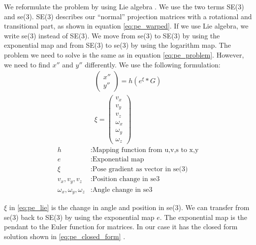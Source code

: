 \documentclass[11pt,a4paper,titlepage,oneside]{report}
\begin{document}
We reformulate the problem by using Lie algebra \cite{se3_explain}. We use the two terms SE(3) and se(3). SE(3) describes our ``normal'' projection matrices with a rotational and transitional part, as shown in equation \ref{eq:pe_warped}. If we use Lie algebra, we write se(3) instead of SE(3). We move from se(3) to SE(3) by using the exponential map and from SE(3) to se(3) by using the logarithm map. The problem we need to solve is the same as in equation \ref{eq:pe_problem}. However, we need to find $x''$ and $y''$ differently. We use the following formulation:
\begin{equation}\label{eq:pe_lie}
  \begin{gathered}
    \begin{pmatrix}
      x''\\
      y''
    \end{pmatrix}
    =h(e^{\xi}*G)\\
    \xi=\begin{pmatrix}
      v_x\\
      v_y\\
      v_z\\
      \omega_x\\
      \omega_y\\
      \omega_z
    \end{pmatrix}
  \end{gathered}
\end{equation}
\begin{align*}
  h                            &: \text{Mapping function from u,v,s to x,y}\\
  e                            &: \text{Exponential map}\\
  \xi                          &: \text{Pose gradient as vector in se(3)}\\
  v_x,v_y,v_z                  &: \text{Position change in se3}\\
  \omega_x,\omega_y,\omega_z   &: \text{Angle change in se3}
\end{align*}

$\xi$ in \ref{eq:pe_lie} is the change in angle and position in se(3). We can transfer from se(3) back to SE(3) by using the exponential map $e$. The exponential map is the pendant to the Euler function for matrices. In our case it has the closed form solution shown in \ref{eq:pe_closed_form} \cite{rvc}.
\end{document}
